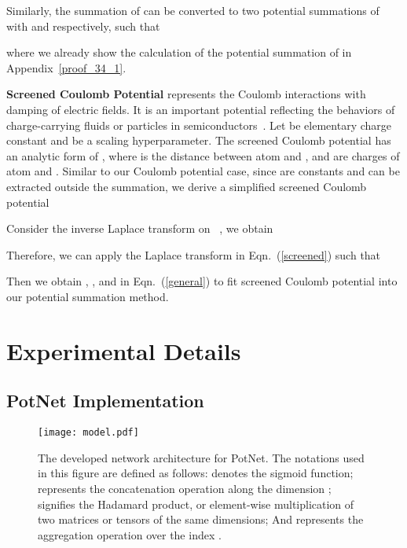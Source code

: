 \documentclass[nohyperref]{article}
\theoremstyle{plain}
\theoremstyle{definition}
\theoremstyle{remark}
\begin{document}
Similarly, the summation of  can be converted to two potential summations of  with  and  respectively, such that

where we already show the calculation of the potential summation of  in Appendix~\ref{proof_34_1}.

\textbf{Screened Coulomb Potential} represents the Coulomb interactions with damping of electric fields. It is an important potential reflecting the behaviors of charge-carrying fluids or particles in semiconductors~\citep{kirichenko2021influence}. Let  be elementary charge constant and  be a scaling hyperparameter. The screened Coulomb potential has an analytic form of , where  is the distance between atom  and , and  are charges of atom  and . Similar to our Coulomb potential case, since  are constants and can be extracted outside the summation, we derive a simplified screened Coulomb potential

Consider the inverse Laplace transform on ~\citep{bateman1954tables}, we obtain

Therefore, we can apply the Laplace transform in Eqn.~(\ref{screened}) such that

Then we obtain , ,  and  in Eqn.~(\ref{general}) to fit screened Coulomb potential into our potential summation method.


\section{Experimental Details}

\subsection{PotNet Implementation}
\label{model}

\begin{figure}[t]
    \centering
    \texttt{[image: model.pdf]}
    \caption{The developed network architecture for PotNet. The notations used in this figure are defined as follows:  denotes the sigmoid function;  represents the concatenation operation along the dimension ;  signifies the Hadamard product, or element-wise multiplication of two matrices or tensors of the same dimensions; And  represents the aggregation operation over the index .
}
    \label{fig:model}
\end{figure}
\end{document}
